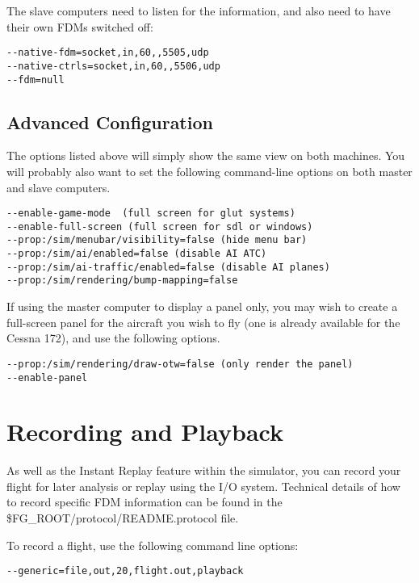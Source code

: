 \begin{enumerate}
The slave computers need to listen for the information, and also need to have
their own FDMs switched off:

\begin{verbatim}
--native-fdm=socket,in,60,,5505,udp
--native-ctrls=socket,in,60,,5506,udp
--fdm=null
\end{verbatim}

\subsection{Advanced Configuration}

The options listed above will simply show the same view on both machines. You will probably also want to set the
following command-line options on both master and slave computers.

\begin{verbatim}
--enable-game-mode  (full screen for glut systems)
--enable-full-screen (full screen for sdl or windows)
--prop:/sim/menubar/visibility=false (hide menu bar)
--prop:/sim/ai/enabled=false (disable AI ATC)
--prop:/sim/ai-traffic/enabled=false (disable AI planes)
--prop:/sim/rendering/bump-mapping=false
\end{verbatim}

If using the master computer to display a panel only, you may wish to create a full-screen panel for the
aircraft you wish to fly (one is already available for the Cessna 172), and use the following options.

\begin{verbatim}
--prop:/sim/rendering/draw-otw=false (only render the panel)
--enable-panel
\end{verbatim}

\section{Recording and Playback}

As well as the Instant Replay feature within the simulator, you can record your
flight for later analysis or replay using the I/O system.  Technical details of
how to record specific FDM information can be found in the
\$FG\_ROOT/protocol/README.protocol file.

To record a flight, use the following command line options:

\begin{verbatim}
--generic=file,out,20,flight.out,playback
\end{verbatim}


\end{enumerate}
